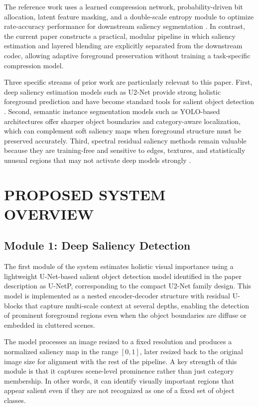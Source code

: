 \documentclass[11pt,                                                             
 superscriptaddress,twoside,
 amsmath,amssymb,
 aps, physrev
]{revtex4-2}
\begin{document}
The reference work uses a learned compression network, probability-driven bit allocation, latent feature masking, and a double-scale entropy module to optimize rate-accuracy performance for downstream saliency segmentation \cite{li2023arxiv}. In contrast, the current paper constructs a practical, modular pipeline in which saliency estimation and layered blending are explicitly separated from the downstream codec, allowing adaptive foreground preservation without training a task-specific compression model.

Three specific streams of prior work are particularly relevant to this paper. First, deep saliency estimation models such as U2-Net provide strong holistic foreground prediction and have become standard tools for salient object detection \cite{li2024ieee}. Second, semantic instance segmentation models such as YOLO-based architectures offer sharper object boundaries and category-aware localization, which can complement soft saliency maps when foreground structure must be preserved accurately. Third, spectral residual saliency methods remain valuable because they are training-free and sensitive to edges, textures, and statistically unusual regions that may not activate deep models strongly \cite{hou2007ieee}.

\section{PROPOSED SYSTEM OVERVIEW}

\subsection{Module 1: Deep Saliency Detection}
The first module of the system estimates holistic visual importance using a lightweight U-Net-based salient object detection model identified in the paper description as U-NetP, corresponding to the compact U2-Net family design. This model is implemented as a nested encoder-decoder structure with residual U-blocks that capture multi-scale context at several depths, enabling the detection of prominent foreground regions even when the object boundaries are diffuse or embedded in cluttered scenes.

The model processes an image resized to a fixed resolution and produces a normalized saliency map in the range $[0, 1]$, later resized back to the original image size for alignment with the rest of the pipeline. A key strength of this module is that it captures scene-level prominence rather than just category membership. In other words, it can identify visually important regions that appear salient even if they are not recognized as one of a fixed set of object classes.
\end{document}
